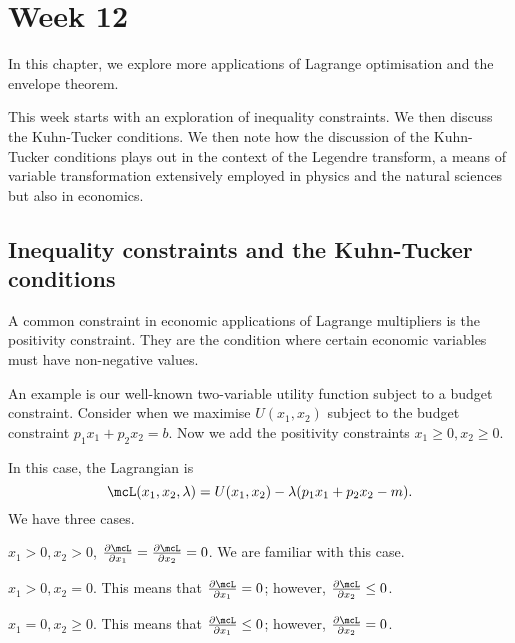 \documentclass[a4paper, 12pt,oneside,openany]{book}
\begin{document}
\chapter{Week 12}

In this chapter, we explore more applications of Lagrange optimisation and the envelope theorem. 

This week starts with an exploration of inequality constraints. We then discuss the Kuhn-Tucker conditions. We then note how the discussion of the Kuhn-Tucker conditions plays out in the context of the Legendre transform, a means of variable transformation extensively employed in physics and the natural sciences but also in economics. 

\section{Inequality constraints and the Kuhn-Tucker conditions}

A common constraint in economic applications of Lagrange multipliers is the positivity constraint. They are the condition where certain economic variables must have non-negative values.

An example is our well-known two-variable utility function subject to a budget constraint. Consider when we maximise $U(x_1, x_2)$ subject to the budget constraint $p_1x_1+p_2x_2=b$. Now we add the positivity constraints $x_1 \geq0, x_2 \geq 0$. 

In this case, the Lagrangian is $$\mcL(x_1, x_2, \lambda)=U(x_1, x_2)-\lambda(p_1x_1+p_2x_2-m).$$ We have three cases.

 $x_1>0, x_2>0$, $\frac{\partial \mcL}{\partial x_1}=\frac{\partial \mcL}{\partial x_2}=0$. We are familiar with this case.

 $x_1>0, x_2=0$. This means that $\frac{\partial \mcL}{\partial x_1}=0$; however, $\frac{\partial \mcL}{\partial x_2}\leq 0$. 

 $x_1=0, x_2\geq0$. This means that $\frac{\partial \mcL}{\partial x_1}\leq0$; however, $\frac{\partial \mcL}{\partial x_2}= 0$. 

\end{document}
